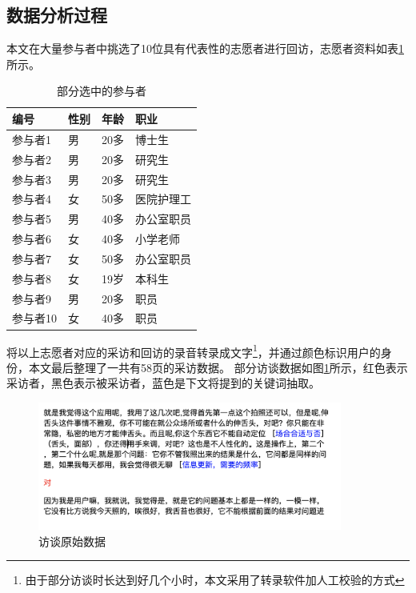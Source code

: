 


\subsection{数据分析过程}

本文在大量参与者中挑选了10位具有代表性的志愿者进行回访，志愿者资料如表\ref{tab:part}所示。
\begin{table}[htb]
    \centering
    \caption{部分选中的参与者}
    \begin{tabular}{llll}
          \toprule
          编号 &	性别 &	年龄 &	职业 \\
          \midrule
          参与者1 &	男 &	20多 &	博士生 \\
          参与者2 &	男 &	20多 &	研究生 \\
          参与者3 &	男 &	20多 &	研究生 \\
          参与者4 &	女 &	50多 &	医院护理工 \\
          参与者5 &	男 &	40多 &	办公室职员 \\
          参与者6 &	女 &	40多 &	小学老师 \\
          参与者7 &	女 &	50多 &	办公室职员 \\
          参与者8 &	女 &	19岁 &	本科生 \\
          参与者9 &	男 &	20多 &	职员 \\
          参与者10 &	女 &	40多 &	职员 \\
          \bottomrule
    \end{tabular}
    \label{tab:part}
\end{table}
将以上志愿者对应的采访和回访的录音转录成文字\footnote{由于部分访谈时长达到好几个小时，本文采用了转录软件加人工校验的方式}，并通过颜色标识用户的身份，本文最后整理了一共有58页的采访数据。
部分访谈数据如图\ref{fig:datas}所示，红色表示采访者，黑色表示被采访者，蓝色是下文将提到的关键词抽取。

\begin{figure}[htb]
    \centering
    \includegraphics[width=10cm]{images/data.png}
    \caption{访谈原始数据}
    \label{fig:datas}
\end{figure}




